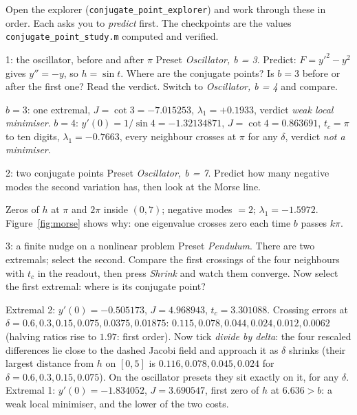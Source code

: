 \documentclass[11pt]{article}
\newcommand{\file}[1]{\texttt{#1}}
\begin{document}
Open the explorer (\file{conjugate\_point\_explorer}) and work through these in
order. Each asks you to \emph{predict} first. The checkpoints are the values
\file{conjugate\_point\_study.m} computed and verified.

\begin{expt}{1: the oscillator, before and after $\pi$}
Preset \emph{Oscillator, b = 3}. Predict: $F = y'^2 - y^2$ gives $y'' = -y$, so
$h = \sin t$. Where are the conjugate points? Is $b = 3$ before or after the
first one? Read the verdict. Switch to \emph{Oscillator, b = 4} and compare.
\begin{chk}
$b = 3$: one extremal, $J = \cot 3 = -7.015253$, $\lambda_1 = +0.1933$, verdict
\emph{weak local minimiser}. $b = 4$: $y'(0) = 1/\sin 4 = -1.32134871$,
$J = \cot 4 = 0.863691$, $t_c = \pi$ to ten digits, $\lambda_1 = -0.7663$, every
neighbour crosses at $\pi$ for any $\delta$, verdict \emph{not a minimiser}.
\end{chk}
\end{expt}

\begin{expt}{2: two conjugate points}
Preset \emph{Oscillator, b = 7}. Predict how many negative modes the second
variation has, then look at the Morse line.
\begin{chk}
Zeros of $h$ at $\pi$ and $2\pi$ inside $(0,7)$; negative modes $= 2$;
$\lambda_1 = -1.5972$. Figure~\ref{fig:morse} shows why: one eigenvalue crosses
zero each time $b$ passes $k\pi$.
\end{chk}
\end{expt}

\begin{expt}{3: a finite nudge on a nonlinear problem}
Preset \emph{Pendulum}. There are two extremals; select the second. Compare the
first crossings of the four neighbours with $t_c$ in the readout, then press
\emph{Shrink} and watch them converge. Now select the first extremal: where is
its conjugate point?
\begin{chk}
Extremal 2: $y'(0) = -0.505173$, $J = 4.968943$, $t_c = 3.301088$. Crossing
errors at $\delta = 0.6, 0.3, 0.15, 0.075, 0.0375, 0.01875$:
$0.115, 0.078, 0.044, 0.024, 0.012, 0.0062$ (halving ratios rise to $1.97$:
first order). Now tick \emph{divide by delta}: the four rescaled differences lie
close to the dashed Jacobi field and approach it as $\delta$ shrinks (their
largest distance from $h$ on $[0,5]$ is $0.116, 0.078, 0.045, 0.024$ for
$\delta = 0.6, 0.3, 0.15, 0.075$). On the oscillator presets they sit exactly on
it, for any $\delta$. Extremal 1: $y'(0) = -1.834052$, $J = 3.690547$, first zero
of $h$ at $6.636 > b$: a weak local minimiser, and the lower of the two costs.
\end{chk}
\end{expt}
\end{document}
